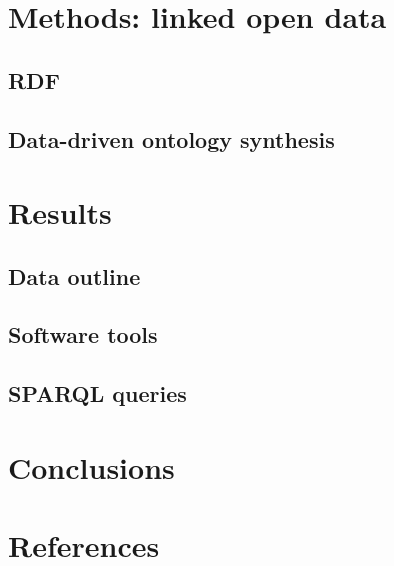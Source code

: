 \documentclass[review]{elsarticle}
\begin{document}
\section{Methods: linked open data}
\subsection{RDF}
\subsection{Data-driven ontology synthesis}

\section{Results}
\label{outline}
\subsection{Data outline}
\subsection{Software tools}
\subsection{SPARQL queries}

\section{Conclusions}
\label{conclusions}

\section*{References}
%

%
%
\end{document}
